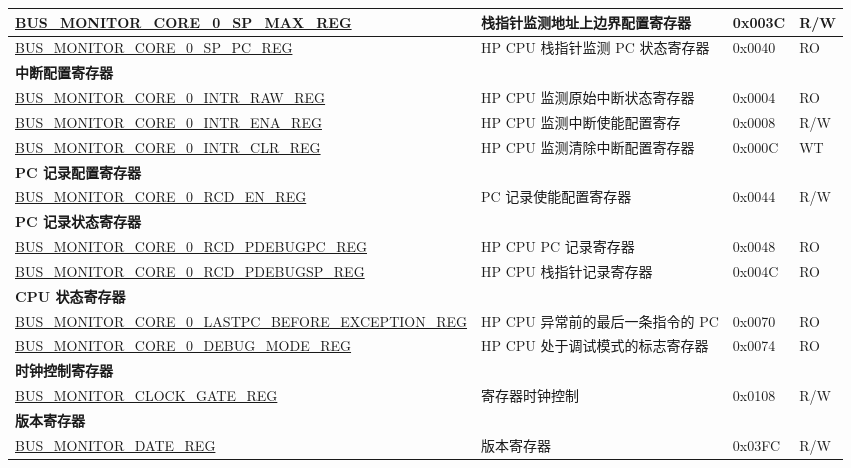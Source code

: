 \begin{longtable}{ |p{10cm} | p{9cm}| l | l | }
\hyperref[regdesc:BUSMONITORCORE0SPMAXREG]{BUS\_MONITOR\_CORE\_0\_SP\_MAX\_REG} & 栈指针监测地址上边界配置寄存器 & 0x003C & R/W \\ \hline
\hyperref[regdesc:BUSMONITORCORE0SPPCREG]{BUS\_MONITOR\_CORE\_0\_SP\_PC\_REG} & HP CPU 栈指针监测 PC 状态寄存器 & 0x0040 & RO \\ \hline
\multicolumn{4}{|l|}{\textbf{中断配置寄存器}} \\ \hline
\hyperref[regdesc:BUSMONITORCORE0INTRRAWREG]{BUS\_MONITOR\_CORE\_0\_INTR\_RAW\_REG} & HP CPU 监测原始中断状态寄存器 & 0x0004 & RO \\ \hline
\hyperref[regdesc:BUSMONITORCORE0INTRENAREG]{BUS\_MONITOR\_CORE\_0\_INTR\_ENA\_REG} & HP CPU 监测中断使能配置寄存& 0x0008 & R/W \\ \hline
\hyperref[regdesc:BUSMONITORCORE0INTRCLRREG]{BUS\_MONITOR\_CORE\_0\_INTR\_CLR\_REG} & HP CPU 监测清除中断配置寄存器 & 0x000C & WT \\ \hline
\multicolumn{4}{|l|}{\textbf{PC 记录配置寄存器}} \\ \hline
\hyperref[regdesc:BUSMONITORCORE0RCDENREG]{BUS\_MONITOR\_CORE\_0\_RCD\_EN\_REG} & PC 记录使能配置寄存器 & 0x0044 & R/W \\ \hline
\multicolumn{4}{|l|}{\textbf{PC 记录状态寄存器}} \\ \hline
\hyperref[regdesc:BUSMONITORCORE0RCDPDEBUGPCREG]{BUS\_MONITOR\_CORE\_0\_RCD\_PDEBUGPC\_REG} & HP CPU PC 记录寄存器 & 0x0048 & RO \\ \hline
\hyperref[regdesc:BUSMONITORCORE0RCDPDEBUGSPREG]{BUS\_MONITOR\_CORE\_0\_RCD\_PDEBUGSP\_REG} & HP CPU 栈指针记录寄存器 & 0x004C & RO \\ \hline
\multicolumn{4}{|l|}{\textbf{CPU 状态寄存器}} \\ \hline
\hyperref[regdesc:BUSMONITORCORE0LASTPCBEFOREEXCEPTIONREG]{BUS\_MONITOR\_CORE\_0\_LASTPC\_BEFORE\_EXCEPTION\_REG} & HP CPU 异常前的最后一条指令的 PC  & 0x0070 & RO \\ \hline
\hyperref[regdesc:BUSMONITORCORE0DEBUGMODEREG]{BUS\_MONITOR\_CORE\_0\_DEBUG\_MODE\_REG} & HP CPU 处于调试模式的标志寄存器 & 0x0074 & RO \\ \hline
\multicolumn{4}{|l|}{\textbf{时钟控制寄存器}} \\ \hline
\hyperref[regdesc:BUSMONITORCLOCKGATEREG]{BUS\_MONITOR\_CLOCK\_GATE\_REG} & 寄存器时钟控制 & 0x0108 & R/W \\ \hline
\multicolumn{4}{|l|}{\textbf{版本寄存器}} \\ \hline
\hyperref[regdesc:BUSMONITORDATEREG]{BUS\_MONITOR\_DATE\_REG} & 版本寄存器 & 0x03FC & R/W \\ \hline
\end{longtable}
